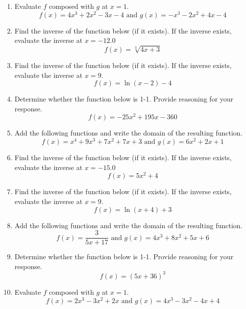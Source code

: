 \documentclass[14pt]{extbook}
\begin{document}
\begin{enumerate}
\item{
Evaluate $f$ composed with $g$ at $x=1$.\[ f(x) = 4x^{3} +2 x^{2} -3 x -4 \text{ and } g(x) = -x^{3} -2 x^{2} +4 x -4 \]} \newpage
\item{
Find the inverse of the function below (if it exists). If the inverse exists, evaluate the inverse at $x = -12.0$\[ f(x) = \sqrt[3]{4 x + 3} \]} \newpage
\item{
Find the inverse of the function below (if it exists). If the inverse exists, evaluate the inverse at $x = 9$.\[ f(x) = \ln{(x-2)}-4 \]} \newpage
\item{
Determine whether the function below is 1-1. Provide reasoning for your response.\[ f(x) = -25 x^2 + 195 x - 360 \]} \newpage
\item{
Add the following functions and write the domain of the resulting function.\[ f(x) = x^{4} +9 x^{3} +7 x^{2} +7 x + 3 \text{ and } g(x) = 6x^{2} +2 x + 1 \]} \newpage
\item{
Find the inverse of the function below (if it exists). If the inverse exists, evaluate the inverse at $x = -15.0$\[ f(x) = 5 x^2 + 4 \]} \newpage
\item{
Find the inverse of the function below (if it exists). If the inverse exists, evaluate the inverse at $x = 9$.\[ f(x) = \ln{(x+4)}+3 \]} \newpage
\item{
Add the following functions and write the domain of the resulting function.\[ f(x) = \frac{3}{5x+17} \text{ and } g(x) = 4x^{3} +8 x^{2} +5 x + 6 \]} \newpage
\item{
Determine whether the function below is 1-1. Provide reasoning for your response.\[ f(x) = (5 x + 36)^3 \]} \newpage
\item{
Evaluate $f$ composed with $g$ at $x=1$.\[ f(x) = 2x^{3} -3 x^{2} +2 x \text{ and } g(x) = 4x^{3} -3 x^{2} -4 x + 4 \]} \newpage
\end{enumerate}
\end{document}
